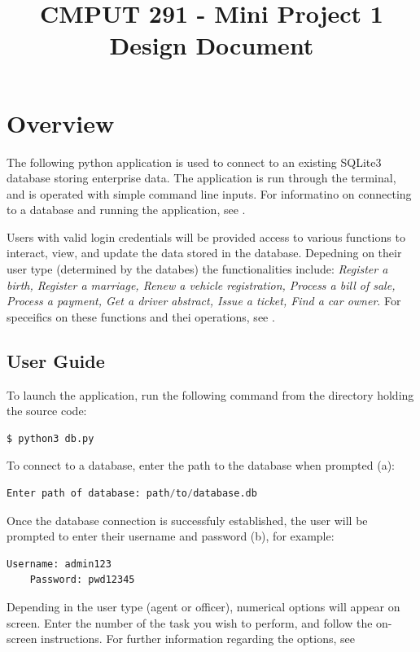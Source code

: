 \documentclass[10pt, a4paper]{article}
\begin{document}
{\selectfont

\title{\vspace{-20mm}CMPUT 291 - Mini Project 1 Design Document}
\date{}
\maketitle
\vspace{-20mm}
\section{Overview}\label{OV}
The following python application is used to connect to an existing SQLite3 database storing enterprise data. The application is run through the terminal, and is operated with simple command line inputs. For informatino on connecting to a database and running the application, see \emph{}.

Users with valid login credentials will be provided access to various functions to interact, view, and update the data stored in the database. Depedning on their user type (determined by the databes) the functionalities include: \emph{Register a birth, Register a marriage, Renew a vehicle registration, Process a bill of sale, Process a payment, Get a driver abstract, Issue a ticket, Find a car owner}. For speceifics on these functions and thei operations, see \emph{}.

\subsection{User Guide}\label{UG}
To launch the application, run the following command from the directory holding the source code:
\begin{lstlisting}[language=Python]
	$ python3 db.py
\end{lstlisting}
To connect to a database, enter the path to the database when prompted (a):
\begin{lstlisting}[language=Python]
	Enter path of database: path/to/database.db
\end{lstlisting}
Once the database connection is successfuly established, the user will be prompted to enter their username and password (b), for example:
\begin{lstlisting}[language=Python]		
	Username: admin123
	Password: pwd12345
\end{lstlisting}
Depending in the user type (agent or officer), numerical options will appear on screen. Enter the number of the task you wish to perform, and follow the on-screen instructions. For further information regarding the options, see \emph{}


}
\end{document}
